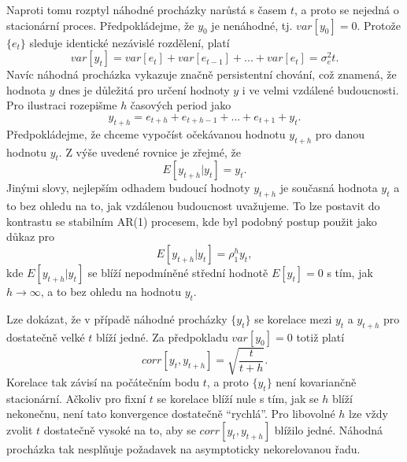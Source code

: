 Naproti tomu rozptyl náhodné procházky narůstá s časem $t$, a proto se nejedná o stacionární proces. Předpokládejme, že $y_0$ je nenáhodné, tj. $var[y_0] = 0$. Protože $\{e_t\}$ sleduje identické nezávislé rozdělení, platí
\begin{equation}
var[y_t] = var[e_t] + var[e_{t - 1}] + ... + var[e_t] = \sigma_e^2 t.
\end{equation}
Navíc náhodná procházka vykazuje značně persistentní chování, což znamená, že hodnota $y$ dnes je důležitá pro určení hodnoty $y$ i ve velmi vzdálené budoucnosti. Pro ilustraci rozepišme $h$ časových period jako
\begin{equation}
y_{t + h} = e_{t + h} + e_{t + h - 1} + ... + e_{t + 1} + y_t.
\end{equation}
Předpokládejme, že chceme vypočíst očekávanou hodnotu $y_{t + h}$ pro danou hodnotu $y_t$. Z výše uvedené rovnice je zřejmé, že
\begin{equation}
E[y_{t + h}|y_t] = y_t.
\end{equation}
Jinými slovy, nejlepším odhadem budoucí hodnoty $y_{t + h}$ je současná hodnota $y_t$ a to bez ohledu na to, jak vzdálenou budoucnost uvažujeme. To lze postavit do kontrastu se stabilním AR(1) procesem, kde byl podobný postup použit jako důkaz pro
\begin{equation}
E[y_{t + h} | y_t] = \rho_1^h y_t,
\end{equation}
kde $E[y_{t + h}|y_t]$ se blíží nepodmíněné střední hodnotě $E[y_t] = 0$ s tím, jak $h \rightarrow \infty$, a to bez ohledu na hodnotu $y_t$.

Lze dokázat, že v případě náhodné procházky $\{y_t\}$ se korelace mezi $y_t$ a $y_{t + h}$ pro dostatečně velké $t$ blíží jedné. Za předpokladu $var[y_0] = 0$ totiž platí
\begin{equation}
corr[y_t, y_{t + h}] = \sqrt{\frac{t}{t + h}}.
\end{equation}
Korelace tak závisí na počátečním bodu $t$, a proto $\{y_t\}$ není kovariančně stacionární. Ačkoliv pro fixní $t$ se korelace blíží nule s tím, jak se $h$ blíží nekonečnu, není tato konvergence dostatečně ``rychlá''.  Pro libovolné $h$ lze vždy zvolit $t$ dostatečně vysoké na to, aby se $corr[y_t, y_{t + h}]$ blížilo jedné. Náhodná procházka tak nesplňuje požadavek na asymptoticky nekorelovanou řadu.

